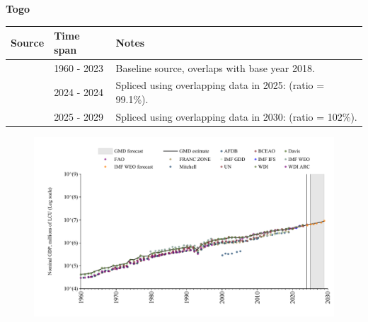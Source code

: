 \documentclass[12pt,a4paper,landscape]{article}
\begin{document}
\begin{adjustbox}{max totalsize={\paperwidth}{\paperheight},center}
\begin{minipage}[t][\textheight][t]{\textwidth}
\vspace*{0.5cm}
{}
\begin{center}
{\Large\bfseries Togo}
\end{center}
\vspace{0.5cm}
\begin{table}[H]
\centering
\small
\begin{tabular}{|l|l|l|}
\hline
\textbf{Source} & \textbf{Time span} & \textbf{Notes} \\
\hline
\rowcolor{white}\cite{WDI}& 1960 - 2023 &Baseline source, overlaps with base year 2018.\\
\rowcolor{lightgray}\cite{BCEAO}& 2024 - 2024 &Spliced using overlapping data in 2025: (ratio = 99.1\%).\\
\rowcolor{white}\cite{IMF_WEO_forecast}& 2025 - 2029 &Spliced using overlapping data in 2030: (ratio = 102\%).\\
\hline
\end{tabular}
\end{table}
\begin{figure}[H]
\centering
\includegraphics[width=\textwidth,height=0.6\textheight,keepaspectratio]{graphs/TGO_nGDP.pdf}
\end{figure}
\end{minipage}
\end{adjustbox}
\end{document}
